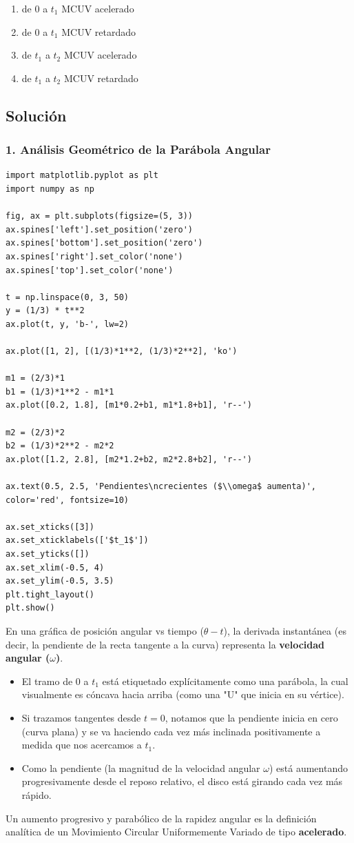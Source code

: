 \documentclass[12pt, a4paper]{article}
\begin{document}
\begin{enumerate}[label=\alph*)]
    \item de $0$ a $t_1$ MCUV acelerado
    \item de $0$ a $t_1$ MCUV retardado
    \item de $t_1$ a $t_2$ MCUV acelerado
    \item de $t_1$ a $t_2$ MCUV retardado
\end{enumerate}

\subsection*{Solución}

\subsubsection*{1. Análisis Geométrico de la Parábola Angular}

\begin{verbatim}
import matplotlib.pyplot as plt
import numpy as np

fig, ax = plt.subplots(figsize=(5, 3))
ax.spines['left'].set_position('zero')
ax.spines['bottom'].set_position('zero')
ax.spines['right'].set_color('none')
ax.spines['top'].set_color('none')

t = np.linspace(0, 3, 50)
y = (1/3) * t**2
ax.plot(t, y, 'b-', lw=2)

ax.plot([1, 2], [(1/3)*1**2, (1/3)*2**2], 'ko')

m1 = (2/3)*1
b1 = (1/3)*1**2 - m1*1
ax.plot([0.2, 1.8], [m1*0.2+b1, m1*1.8+b1], 'r--')

m2 = (2/3)*2
b2 = (1/3)*2**2 - m2*2
ax.plot([1.2, 2.8], [m2*1.2+b2, m2*2.8+b2], 'r--')

ax.text(0.5, 2.5, 'Pendientes\ncrecientes ($\\omega$ aumenta)', color='red', fontsize=10)

ax.set_xticks([3])
ax.set_xticklabels(['$t_1$'])
ax.set_yticks([])
ax.set_xlim(-0.5, 4)
ax.set_ylim(-0.5, 3.5)
plt.tight_layout()
plt.show()
\end{verbatim}

En una gráfica de posición angular vs tiempo ($\theta - t$), la derivada instantánea (es decir, la pendiente de la recta tangente a la curva) representa la \textbf{velocidad angular ($\omega$)}.
\begin{itemize}
    \item El tramo de $0$ a $t_1$ está etiquetado explícitamente como una parábola, la cual visualmente es cóncava hacia arriba (como una "U" que inicia en su vértice). 
    \item Si trazamos tangentes desde $t=0$, notamos que la pendiente inicia en cero (curva plana) y se va haciendo cada vez más inclinada positivamente a medida que nos acercamos a $t_1$.
    \item Como la pendiente (la magnitud de la velocidad angular $\omega$) está aumentando progresivamente desde el reposo relativo, el disco está girando cada vez más rápido.
\end{itemize}
Un aumento progresivo y parabólico de la rapidez angular es la definición analítica de un Movimiento Circular Uniformemente Variado de tipo \textbf{acelerado}.
\end{document}
